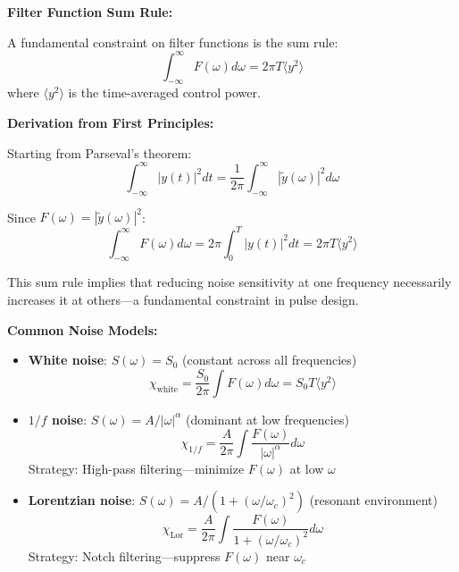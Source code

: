\documentclass[11pt,a4paper]{article}
\theoremstyle{definition}
\theoremstyle{remark}
\begin{document}
\textbf{Filter Function Sum Rule:}

A fundamental constraint on filter functions is the sum rule:
\begin{equation}
\int_{-\infty}^{\infty} F(\omega) d\omega = 2\pi T \langle y^2 \rangle
\end{equation}
where $\langle y^2 \rangle$ is the time-averaged control power.

\textbf{Derivation from First Principles:}

Starting from Parseval's theorem:
\begin{equation}
\int_{-\infty}^{\infty} |y(t)|^2 dt = \frac{1}{2\pi}\int_{-\infty}^{\infty} |\tilde{y}(\omega)|^2 d\omega
\end{equation}

Since $F(\omega) = |\tilde{y}(\omega)|^2$:
\begin{equation}
\int_{-\infty}^{\infty} F(\omega) d\omega = 2\pi \int_0^T |y(t)|^2 dt = 2\pi T \langle y^2 \rangle
\end{equation}

This sum rule implies that reducing noise sensitivity at one frequency necessarily increases it at others—a fundamental constraint in pulse design.

\textbf{Common Noise Models:}

\begin{itemize}
    \item \textbf{White noise}: $S(\omega) = S_0$ (constant across all frequencies)
    \begin{equation}
    \chi_{\text{white}} = \frac{S_0}{2\pi}\int F(\omega)d\omega = S_0 T \langle y^2 \rangle
    \end{equation}

    \item \textbf{$1/f$ noise}: $S(\omega) = A/|\omega|^\alpha$ (dominant at low frequencies)
    \begin{equation}
    \chi_{1/f} = \frac{A}{2\pi}\int \frac{F(\omega)}{|\omega|^\alpha}d\omega
    \end{equation}
    Strategy: High-pass filtering—minimize $F(\omega)$ at low $\omega$

    \item \textbf{Lorentzian noise}: $S(\omega) = A/(1 + (\omega/\omega_c)^2)$ (resonant environment)
    \begin{equation}
    \chi_{\text{Lor}} = \frac{A}{2\pi}\int \frac{F(\omega)}{1 + (\omega/\omega_c)^2}d\omega
    \end{equation}
    Strategy: Notch filtering—suppress $F(\omega)$ near $\omega_c$
\end{itemize}
\end{document}
